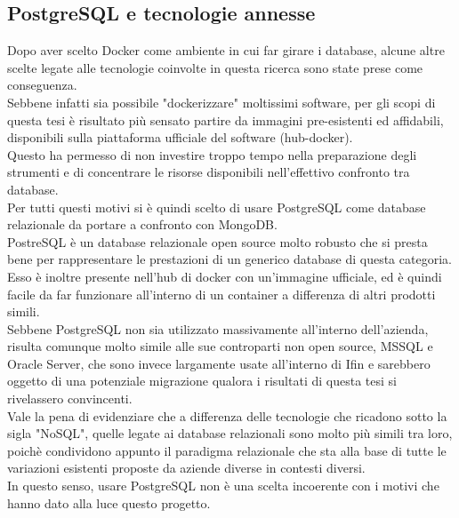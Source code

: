 \subsection{PostgreSQL e tecnologie annesse}
Dopo aver scelto Docker come ambiente in cui far girare i database, alcune altre scelte legate alle tecnologie coinvolte in questa ricerca sono state prese come conseguenza.\\
Sebbene infatti sia possibile "dockerizzare" moltissimi software, per gli scopi di questa tesi è risultato più sensato partire da immagini pre-esistenti ed affidabili, disponibili sulla piattaforma ufficiale del software (hub-docker).\\
Questo ha permesso di non investire troppo tempo nella preparazione degli strumenti e di concentrare le risorse disponibili nell'effettivo confronto tra database.\\

\noindent Per tutti questi motivi si è quindi scelto di usare PostgreSQL come database relazionale da portare a confronto con MongoDB.\\
PostreSQL è un database relazionale open source molto robusto che si presta bene per rappresentare le prestazioni di un generico database di questa categoria. Esso è inoltre presente nell'hub di docker con un'immagine ufficiale, ed è quindi facile da far funzionare all'interno di un container a differenza di altri prodotti simili.\\
Sebbene PostgreSQL non sia utilizzato massivamente all'interno dell'azienda, risulta comunque molto simile alle sue controparti non open source, MSSQL e Oracle Server, che sono invece largamente usate all'interno di Ifin e sarebbero oggetto di una potenziale migrazione qualora i risultati di questa tesi si rivelassero convincenti.\\

\noindent Vale la pena di evidenziare che a differenza delle tecnologie che ricadono sotto la sigla "NoSQL", quelle legate ai database relazionali sono molto più simili tra loro, poichè condividono appunto il paradigma relazionale che sta alla base di tutte le variazioni esistenti proposte da aziende diverse in contesti diversi.\\
In questo senso, usare PostgreSQL non è una scelta incoerente con i motivi che hanno dato alla luce questo progetto.\\


